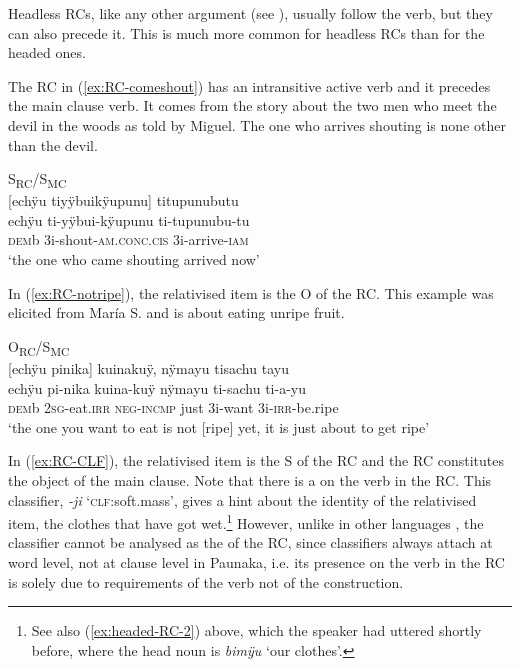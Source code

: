 Headless RCs, like any other argument (see ), usually follow the verb, but they can also precede it. This is much more common for headless RCs than for the headed ones.


The RC in (\ref{ex:RC-comeshout}) has an intransitive active verb and it precedes the main clause verb. It comes from the story about the two men who meet the devil in the woods as told by Miguel. The one who arrives shouting is none other than the devil.

\ea\label{ex:RC-comeshout}
\begingl
\glpreamble \textup{S\textsubscript{RC}/S\textsubscript{MC}}\\\textup{[}echÿu tiyÿbuikÿupunu\textup{]} titupunubutu\\
\gla echÿu ti-yÿbui-kÿupunu ti-tupunubu-tu\\
\glb \textsc{dem}b 3i-shout-\textsc{am.conc.cis} 3i-arrive-\textsc{iam}\\
\glft ‘the one who came shouting arrived now’
\endgl
\trailingcitation{[mxx-n101017s-1.032]}
\xe


In (\ref{ex:RC-notripe}), the relativised item is the O of the RC. This example was elicited from María S. and is about eating unripe fruit.

\ea\label{ex:RC-notripe}
\begingl
\glpreamble \textup{O\textsubscript{RC}/S\textsubscript{MC}}\\\textup{[}echÿu pinika\textup{]} kuinakuÿ, nÿmayu tisachu tayu\\
\gla echÿu pi-nika kuina-kuÿ nÿmayu ti-sachu ti-a-yu\\
\glb \textsc{dem}b 2\textsc{sg}-eat.\textsc{irr} \textsc{neg}-\textsc{incmp} just 3i-want 3i-\textsc{irr}-be.ripe\\
\glft ‘the one you want to eat is not [ripe] yet, it is just about to get ripe’
\endgl
\trailingcitation{[rxx-e181022le]}
\xe

In (\ref{ex:RC-CLF}), the relativised item is the S of the RC and the RC constitutes the object of the main clause. Note that there is a  on the verb in the RC. This classifier, \textit{-ji} ‘\textsc{clf:}soft.mass’, gives a hint about the identity of the relativised item, the clothes that have got wet.\footnote{See also (\ref{ex:headed-RC-2}) above, which the speaker had uttered shortly before, where the head noun is \textit{bimÿu} ‘our clothes’.} However, unlike in other languages \citep[cf.][]{Epps2012}, the classifier cannot be analysed as the  of the RC, since classifiers always attach at word level, not at clause level in Paunaka, i.e. its presence on the verb in the RC is solely due to requirements of the verb not of the construction.

